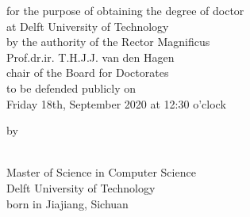 \begin{small}

\begin{center}for the purpose of obtaining the degree of doctor\\
\vspace{1mm}
at Delft University of Technology\\
\vspace{1mm}
by the authority of the Rector Magnificus\\
\vspace{1mm}
Prof.dr.ir. T.H.J.J. van den Hagen\\
\vspace{1mm}
chair of the Board for Doctorates\\
\vspace{1mm}
to be defended publicly on\\
\vspace{1mm}
Friday 18th, September 2020 at 12:30 o'clock
\vspace{1mm}
\vspace{10mm} %

by

\vspace{10mm}
\textbf{\theauthor}\\
\vspace{1mm}
Master of Science in Computer Science\\
\vspace{1mm}
Delft University of Technology\\
\vspace{1mm}
born in Jiajiang, Sichuan
\vspace{1mm}
\end{center}

\end{small}


